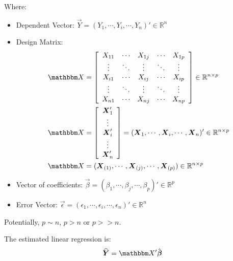 Where:
\begin{itemize}
\item Dependent Vector: $\Vec{Y} = (Y_1, \cdots, Y_i, \cdots, Y_n)' \in \mathbb{R}^n$
\item Design Matrix: 
    \begin{align*}
        \Mat{X} &= \left[
            \begin{array}{cccccc}
                X_{11} & \cdots & X_{1j} & \cdots & X_{1p} \\
                \vdots & \ddots & \vdots & \ddots & \vdots \\
                X_{i1} & \cdots & X_{ij} & \cdots & X_{ip} \\
                \vdots & \ddots & \vdots & \ddots & \vdots \\
                X_{n1} & \cdots & X_{nj} & \cdots & X_{np} \\
            \end{array}
        \right] \in \mathbb{R}^{n \times p}\\
        \Mat{X} &= \left[
            \begin{array}{cccccc}
                \Vec{X}_{1}' \\
                \vdots \\
                \Vec{X}_{i}' \\
                \vdots \\
                \Vec{X}_{n}' \\
            \end{array}
        \right] = (\Vec{X}_1, \cdots, \Vec{X}_i, \cdots, \Vec{X}_n)' \in \mathbb{R}^{n \times p}\\
        \Mat{X} &= (\Vec{X}_{(1)}, \cdots, \Vec{X}_{(j)}, \cdots, \Vec{X}_{(p)}) \in \mathbb{R}^{n \times p}\\
    \end{align*}
\item Vector of coefficients: $\Vec{\beta} = (\beta_1, \cdots, \beta_j, \cdots, \beta_p)' \in \mathbb{R}^p$
\item Error Vector: $\Vec{\epsilon} = (\epsilon_1, \cdots, \epsilon_i, \cdots, \epsilon_n)' \in \mathbb{R}^n$
\end{itemize}

Potentially, $p \sim n$, $p > n$ or $p >> n$.


The estimated linear regression is:
\begin{align*}
\widehat{\Vec{Y}} = \Mat{X}'\hat{\Vec{\beta}}
\end{align*}

